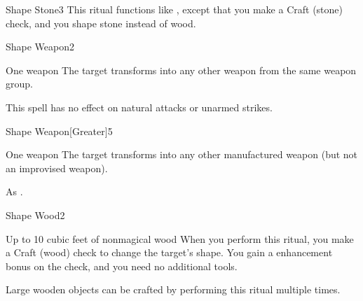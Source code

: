 \begin{spellsection}{Shape Stone}{3}
\spellspecial This ritual functions like , except that you make a Craft (stone) check, and you shape stone instead of wood.
\end{spellsection}

\begin{spellsection}{Shape Weapon}{2}
\begin{spelltarget}{One weapon}
\spelleffect The target transforms into any other weapon from the same weapon group.
\end{spelltarget}
\spellnotes This spell has no effect on natural attacks or unarmed strikes.
\end{spellsection}

\begin{spellsection}{Shape Weapon}[Greater]{5}
\begin{spelltarget}{One weapon}
\spelleffect The target transforms into any other manufactured weapon (but not an improvised weapon).
\end{spelltarget}
\spellnotes As .
\end{spellsection}

\begin{spellsection}{Shape Wood}{2}
\begin{spelltarget}{Up to 10 cubic feet of nonmagical wood}
    \spelleffect When you perform this ritual, you make a Craft (wood) check to change the target's shape. You gain a  enhancement bonus on the check, and you need no additional tools.
\end{spelltarget}
\spellnotes Large wooden objects can be crafted by performing this ritual multiple times.
\end{spellsection}

